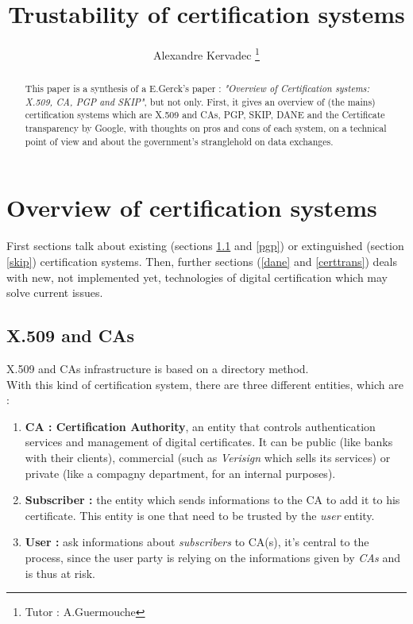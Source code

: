 \documentclass[journal, a4paper]{IEEEtran}
\begin{document}
	\title{Trustability of certification systems}
	\author{Alexandre Kervadec
	\thanks{Tutor : A.Guermouche}}
	\maketitle

\begin{abstract}
This paper is a synthesis of a E.Gerck's paper : \textit{"Overview of Certification systems: X.509, CA, PGP and SKIP"}\cite{gerck1998overview}, but not only. First, it gives an overview of (the mains) certification systems which are X.509 and CAs, PGP, SKIP, DANE and the Certificate transparency by Google, with thoughts on pros and cons of each system, on a technical point of view and about the government's stranglehold on data exchanges.
\end{abstract}

\section{Overview of certification systems}

First sections talk about existing (sections \ref{x509} and \ref{pgp}) or extinguished (section \ref{skip}) certification systems. Then, further sections (\ref{dane} and \ref{certtrans}) deals with new, not implemented yet, technologies of digital certification which may solve current issues. 


\subsection{X.509 and CAs}
\label{x509}

X.509 and CAs\cite{rfc3647} infrastructure is based on a directory method.\\
With this kind of certification system, there are three different entities, which are :

\begin{enumerate}
	\item \textbf{CA : Certification Authority}, an entity that controls authentication services and management of digital certificates. It can be public (like banks with their clients), commercial (such as \textit{Verisign} which sells its services) or private (like a compagny department, for an internal purposes).
	\item \textbf{Subscriber :} the entity which sends informations to the CA to add it to his certificate. This entity is one that need to be trusted by the \textit{user} entity.
	\item \textbf{User :} ask informations about \textit{subscribers} to CA(s), it's central to the process, since the user party is relying on the informations given by \textit{CAs} and is thus at risk.
\end{enumerate}
\end{document}
